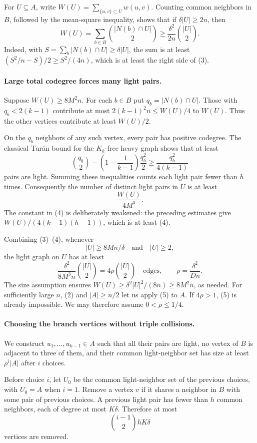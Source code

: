 For \(U\subseteq A\), write
\(W(U)=\sum_{\{u,v\}\subset U}w(u,v)\). Counting common neighbors in \(B\), followed by the mean-square inequality, shows that if \(\delta|U|\geq2n\), then
\[
 W(U)=\sum_{b\in B}\binom{|N(b)\cap U|}{2}
 \geq\frac{\delta^2}{2n}\binom{|U|}{2}. \tag{3}
\]
Indeed, with \(S=\sum_b|N(b)\cap U|\geq\delta|U|\), the sum is at least \((S^2/n-S)/2\geq S^2/(4n)\), which is at least the right side of (3).

\paragraph{Large total codegree forces many light pairs.}
Suppose \(W(U)\geq8M^2n\). For each \(b\in B\) put \(q_b=|N(b)\cap U|\). Those with \(q_b<2(k-1)\) contribute at most \(2(k-1)^2n\leq W(U)/4\) to \(W(U)\). Thus the other vertices contribute at least \(W(U)/2\).

On the \(q_b\) neighbors of any such vertex, every pair has positive codegree. The classical Tur\'an bound for the \(K_k\)-free heavy graph shows that at least
\[
 \binom{q_b}{2}-\left(1-\frac1{k-1}\right)\frac{q_b^2}{2}
 \geq\frac{q_b^2}{4(k-1)}
\]
pairs are light. Summing these inequalities counts each light pair fewer than \(h\) times. Consequently the number of distinct light pairs in \(U\) is at least
\[
 \frac{W(U)}{4M^3}. \tag{4}
\]
The constant in (4) is deliberately weakened: the preceding estimates give \(W(U)/(4(k-1)(h-1))\), which is at least (4).

Combining (3)--(4), whenever
\[
 |U|\geq8M n/\delta\quad\text{and}\quad |U|\geq2,
\]
the light graph on \(U\) has at least
\[
 \frac{\delta^2}{8M^3n}\binom{|U|}{2}
 =4\rho\binom{|U|}{2}\quad\text{edges},
 \qquad\rho=\frac{\delta^2}{Dn}. \tag{5}
\]
The size assumption ensures \(W(U)\geq\delta^2|U|^2/(8n)\geq8M^2n\), as needed.
For sufficiently large \(n\), (2) and \(|A|\geq n/2\) let us apply (5) to \(A\). If \(4\rho>1\), (5) is already impossible. We may therefore assume \(0<\rho\leq1/4\).

\paragraph{Choosing the branch vertices without triple collisions.}
We construct \(u_1,\ldots,u_{k-1}\in A\) such that all their pairs are light, no vertex of \(B\) is adjacent to three of them, and their common light-neighbor set has size at least \(\rho^i|A|\) after \(i\) choices.

Before choice \(i\), let \(U_0\) be the common light-neighbor set of the previous choices, with \(U_0=A\) when \(i=1\). Remove a vertex \(v\) if it shares a neighbor in \(B\) with some pair of previous choices. A previous light pair has fewer than \(h\) common neighbors, each of degree at most \(K\delta\). Therefore at most
\[
 \binom{i-1}{2}hK\delta \tag{6}
\]
vertices are removed.

